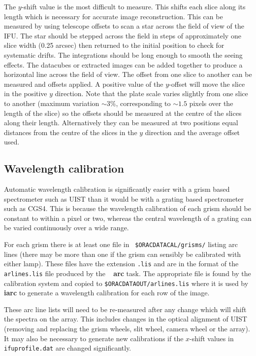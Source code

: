 \documentclass[twoside,11pt]{article}
\newcommand{\xref}[3]{#1}
\renewcommand{\_}{\texttt{\symbol{95}}}
\newcommand{\FIGARO}{\xref{{\sc{Figaro}}}{sun86}{}}
\begin{document}
The $y$-shift value is the most difficult to measure. This shifts each
slice along its length which is necessary for accurate image
reconstruction. This can be measured by using telescope offsets to
scan a star across the field of view of the IFU. The star should be
stepped across the field in steps of approximately one slice width
(0.25 arcsec) then returned to the initial position to check for
systematic drifts. The integrations should be long enough to smooth
the seeing effects.  The datacubes or extracted images can be added
together to produce a horizontal line across the field of view. The
offset from one slice to another can be measured and offsets applied.
A positive value of the $y$-offset will move the slice in the positive
$y$ direction. Note that the plate scale varies slightly from one
slice to another (maximum variation $\sim 3\%$, corresponding to $\sim
1.5$ pixels over the length of the slice) so the offsets should be
measured at the centre of the slices along their length. Alternatively
they can be measured at two positions equal distances from the centre
of the slices in the $y$ direction and the average offset used.





\subsection{Wavelength calibration}
\label{arclines}

Automatic wavelength calibration is significantly easier with a grism
based spectrometer such as UIST than it would be with a grating based
spectrometer such as CGS4. This is because the wavelength calibration of each
grism should be constant to within a pixel or two, whereas the central
wavelength of a grating can be varied continuously over a wide range. 

For each grism there is at least one file in {\tt
  \$ORAC\_DATA\_CAL/grisms/} listing arc lines (there may be more than
one if the grism can sensibly be calibrated with either lamp). These
files have the extension {\tt .lis} and are in the format of the {\tt
  arlines.lis} file produced by the \FIGARO\ \xref{{\bf
    arc}}{sun86}{ARC} task. The appropriate file is found by the
calibration system and copied to {\tt \$ORAC\_DATA\_OUT/arlines.lis}
where it is used by \xref{{\bf iarc}}{sun86}{IARC} to generate a
wavelength calibration for each row of the image.

These arc line lists will need to be re-measured after any change
which will shift the spectra on the array. This includes changes in
the optical alignment of UIST (removing and replacing the grism
wheels, slit wheel, camera wheel or the array). It may also be
necessary to generate new calibrations if the $x$-shift values in {\tt
  ifu\_profile.dat} are changed significantly.
\end{document}
